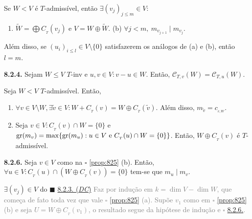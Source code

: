 \hypertarget{thmDC}{}
\begin{theorem}
    \label{thm:823}
    Se \(W < V\) é \(T\)-admissível, então \(\exists (v_j)_{j\leq m} \in V : \)   
    \begin{enumerate}[label = (\alph*), left = 1.5cm]
        \item \(\widetilde{W} = \bigoplus C_{_T}(v_j)\) e \(V = W \oplus \widetilde{W}\). \hspace{1cm} (b) \(\forall j< m, \ m_{v_{j+1}} \mid m_{v_j}\). 
    \end{enumerate}
    Além disso, se \((u_i)_{i\leq l} \in V \setminus \{0\}\) satisfazerem os análogos de (a) e (b), então \(l=m\). 
\end{theorem}
    \begin{lemma}
        \textbf{8.2.4.} Sejam \(W \leq V\) $T$-inv e \(u,v \in V: v-u \in W\). Então, \(\mathscr{C}_{{T,v}}(W) = \mathscr{C}_{{T,u}}(W)\). 
    \end{lemma}
    \begin{proposition}
        \label{prop:825}
        Seja \(W<V\) $T$-admissível. Então, 
        \begin{enumerate}[label = (\alph*), left = 0.65cm]
            \item \(\forall v \in V \setminus W, \exists \widetilde{v} \in V : W + C_{_T}(v) = W \oplus C_{_T}(\widetilde{v})\). Além disso, \(m_{\widetilde{v}} = c_{_{v,W}}\). 
            \item Seja \(v \in V : C_{_T}(v) \cap W = \{0\}\) e \(\operatorname{gr}(m_v) = \max\{\operatorname{gr}(m_u): u \in V \text{ e } C_{_T}(u)\cap W = \{ 0\}\}\). Então, \(W \oplus C_{_T}(v) \) é $T$-admissível.
        \end{enumerate}
    \end{proposition}
    \hypertarget{lemma826}{}
    \begin{lemma}
        \textbf{8.2.6.} Seja \(v \in V\) como na \(\square\) \ref{prop:825} (b). Então, \(\forall u \in V : C_{_T}(u) \cap (W \oplus C_{_T}(v)) = \{0\}\) tem-se que \(m_u \mid m_v\).  
    \end{lemma}
\begin{tcolorbox}[colframe=gray, colback=white, boxrule=0.8pt]
    \centering \(\exists (v_j) \in V\) do \(\blacksquare\) \hyperlink{thmDC}{8.2.3. (\emph{DC})} 
    \tcblower 
\textcolor{gray}{Faz por indução em \(k = \dim V - \dim W\), que começa de fato toda vez que vale \(\square\) \ref{prop:825} (a). Supõe \(v_1\) como em \(\square\) \ref{prop:825} (b) e seja \(U = W \oplus C_{_T}(v_1)\), o resultado segue da hipótese de indução e {\scriptsize\(\square\)} \hyperlink{lemma826}{8.2.6.}. }
\end{tcolorbox} 

